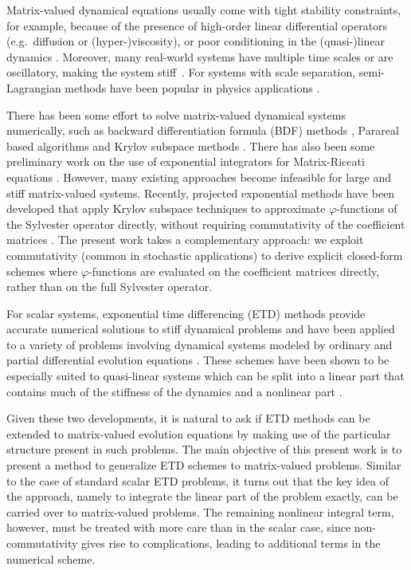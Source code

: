 \documentclass[12pt]{article}
\begin{document}
Matrix-valued dynamical equations usually come with tight stability constraints, for example, because of the presence of high-order linear differential operators (e.g.~diffusion or (hyper-)viscosity), or poor conditioning in the (quasi-)lin\-ear dynamics \cite{cho1996emergence,danilov2000quasi}. Moreover, many real-world systems have multiple time scales or are oscillatory, making the system stiff~\cite{hingham_stiff}. For systems with scale separation, semi-Lagrangian methods have been popular in physics applications \cite{PRUSA20081193}. 

There has been some effort to solve matrix-valued dynamical systems numerically, such as backward differentiation formula (BDF) methods \cite{benner2004bdf}, Parareal based algorithms \cite{parareal_ricatti} and Krylov subspace methods \cite{behr_kyrlov,kyrlov_2}. There has also been some preliminary work on the use of exponential integrators for Matrix-Riccati equations \cite{LI2021113360}. However, many existing approaches become infeasible for large and stiff matrix-valued systems. Recently, projected exponential methods  have been developed that apply Krylov subspace techniques to approximate $\varphi$-functions of the Sylvester operator directly, without requiring commutativity of the coefficient matrices \cite{carrel2023projected}. The present work takes a complementary approach: we exploit commutativity (common in stochastic applications) to derive explicit closed-form schemes where $\varphi$-functions are evaluated on the coefficient matrices directly, rather than on the full Sylvester operator.

For scalar systems, exponential time differencing (ETD) methods provide accurate numerical solutions to stiff dynamical problems \cite{cox-matthews:2002, friedli1978generalized} and have been applied to a variety of problems involving dynamical systems modeled by ordinary and partial differential evolution equations \cite{etd_example_1,ZonostrophicInstability,turb,frisch2008hyperviscosity,ju2015fast}. These schemes have been shown to be especially suited to quasi-linear systems which can be split into a linear part that contains much of the stiffness of the dynamics and a nonlinear part \cite{Minchev2005ARO,ZonostrophicInstability}. 

Given these two developments, it is natural to ask if ETD methods can be extended to matrix-valued evolution equations by making use of the particular structure present in such problems. The main objective of this present work is to present a method to generalize ETD schemes to matrix-valued problems. Similar to the case of standard scalar ETD problems, it turns out that the key idea of the approach, namely to integrate the linear part of the problem exactly, can be carried over to matrix-valued problems. The remaining nonlinear integral term, however, must be treated with more care than in the scalar case, since non-commutativity gives rise to complications, leading to additional terms in the numerical scheme. 
\end{document}
